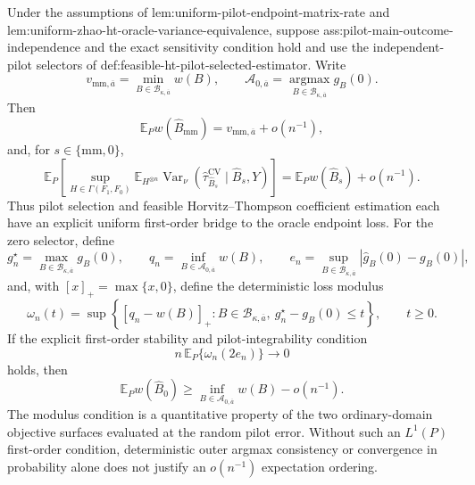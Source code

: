 Under the assumptions of lem:uniform-pilot-endpoint-matrix-rate and lem:uniform-zhao-ht-oracle-variance-equivalence, suppose ass:pilot-main-outcome-independence and the exact sensitivity condition hold and use the independent-pilot selectors of def:feasible-ht-pilot-selected-estimator.  Write
\[
v_{\mathrm{mm},\overline a}=\min_{B\in\mathcal B_{\kappa,\overline a}}w(B),
\qquad
\mathcal A_{0,\overline a}=\operatorname*{argmax}_{B\in\mathcal B_{\kappa,\overline a}}g_B(0).
\]
Then
\[
\mathbb E_P w(\widehat B_{\mathrm{mm}})
=v_{\mathrm{mm},\overline a}+o(n^{-1}),
\]
and, for \(s\in\{\mathrm{mm},0\}\),
\[
\mathbb E_P\left[
\sup_{H\in\Gamma(F_1,F_0)}
\mathbb E_{H^{\otimes n}}
\operatorname{Var}_\nu
(\widehat\tau_{\widehat B_s}^{\mathrm{CV}}\mid\widehat B_s,Y)
\right]
=\mathbb E_Pw(\widehat B_s)+o(n^{-1}).
\]
Thus pilot selection and feasible Horvitz--Thompson coefficient estimation each have an explicit uniform first-order bridge to the oracle endpoint loss.  For the zero selector, define
\[
g_n^\star=\max_{B\in\mathcal B_{\kappa,\overline a}}g_B(0),
\qquad
q_n=\inf_{B\in\mathcal A_{0,\overline a}}w(B),
\qquad
e_n=\sup_{B\in\mathcal B_{\kappa,\overline a}}
|\widehat g_B(0)-g_B(0)|,
\]
and, with \([x]_+=\max\{x,0\}\), define the deterministic loss modulus
\[
\omega_n(t)=
\sup\left\{
[q_n-w(B)]_+:
B\in\mathcal B_{\kappa,\overline a},\ 
g_n^\star-g_B(0)\le t
\right\},
\qquad t\ge0.
\]
If the explicit first-order stability and pilot-integrability condition
\[
n\,\mathbb E_P\{\omega_n(2e_n)\}\longrightarrow0
\]
holds, then
\[
\mathbb E_Pw(\widehat B_0)
\ge\inf_{B\in\mathcal A_{0,\overline a}}w(B)-o(n^{-1}).
\]
The modulus condition is a quantitative property of the two ordinary-domain objective surfaces evaluated at the random pilot error.  Without such an \(L^1(P)\) first-order condition, deterministic outer argmax consistency or convergence in probability alone does not justify an \(o(n^{-1})\) expectation ordering.